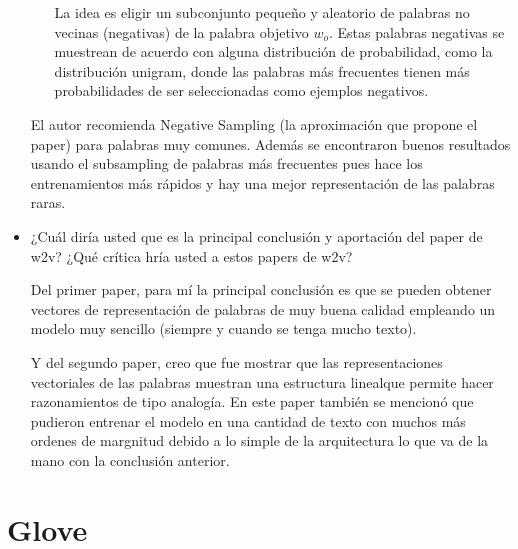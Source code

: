 \documentclass[letter, 11pt, twoside]{report}
\begin{document}
\begin{itemize}
\begin{enumerate}
    La idea es eligir un subconjunto pequeño y aleatorio de palabras no vecinas (negativas) de la palabra objetivo $w_o$. Estas palabras negativas se muestrean de acuerdo con alguna distribución de probabilidad, como la distribución unigram, donde las palabras más frecuentes tienen más probabilidades de ser seleccionadas como ejemplos negativos.
    \end{enumerate}

    El autor recomienda Negative Sampling (la aproximación que propone el paper) para palabras muy comunes. Además se encontraron buenos resultados usando el subsampling de palabras más frecuentes pues hace los entrenamientos más rápidos y hay una mejor representación de las palabras raras.

    \item ¿Cuál diría usted que es la principal conclusión y aportación del paper de w2v? ¿Qué crítica hría usted a estos papers de w2v?
    
    Del primer paper, para mí la principal conclusión es que se pueden obtener vectores de representación de palabras de muy buena calidad empleando un modelo muy sencillo (siempre y cuando se tenga mucho texto). 

    Y del segundo paper, creo que fue mostrar que las representaciones vectoriales de las palabras muestran una estructura linealque permite hacer razonamientos de tipo analogía. 
    En este paper también se mencionó que pudieron entrenar el modelo en una cantidad de texto con muchos más ordenes de margnitud debido a lo simple de la arquitectura lo que va de la mano con la conclusión anterior.
\end{itemize}




\section*{Glove}
\end{document}
